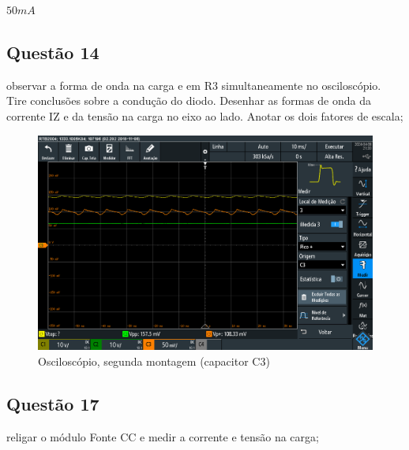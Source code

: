 \documentclass{article}
\begin{document}
\begin{center}
    \begin{tcolorbox}[width=0.4\textwidth, title=\large Fator de escala em Ampere/div]
        \centering
        $50mA$
    \end{tcolorbox}
\end{center}

\subsection{Questão 14}

\begin{tcolorbox}[title=\large Questão 14, colback=red!5!white, colframe=red!75!black]
    \large
    observar a forma de onda na carga e em R3 simultaneamente no osciloscópio. Tire conclusões sobre a condução do diodo. Desenhar as formas de onda da corrente IZ e da tensão na carga no eixo ao lado. Anotar os dois fatores de escala;
\end{tcolorbox}

\begin{figure}[h!]
    \centering
    \includegraphics[width=12cm]{images/SCR07.PNG}
    \caption{Osciloscópio, segunda montagem (capacitor C3)}
\end{figure}

\subsection{Questão 17}

\begin{tcolorbox}[title=\large Questão 17, colback=red!5!white, colframe=red!75!black]
    \large
    religar o módulo Fonte CC e medir a corrente e tensão na carga;
\end{tcolorbox}
\end{document}

